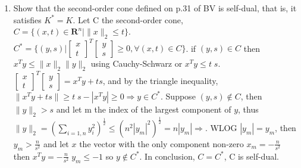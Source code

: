 \documentclass[10pt]{article}
\newcommand{\0}{\mat{0}}
\begin{document}
\begin{enumerate}
\item Show that the second-order cone defined on p.31 of BV is self-dual, that is, it satisfies $K^* = K$.
Let C the second-order cone, $C=\{(x, t) \in  \mathbf{R}^n | \| x \|_2 \le t \}$. $C^* = \{(y,s) | \begin{bmatrix} x \\ t  \end{bmatrix}^T \begin{bmatrix} y \\ s  \end{bmatrix} \ge 0, \forall (x,t) \in C\}$.
if $(y, s) \in C$ then $x^T y \le \| x \|_2 \| y \|_2$ using Cauchy-Schwarz or  $x^T y \le t \; s$. 
$\begin{bmatrix} x \\ t  \end{bmatrix}^T \begin{bmatrix} y \\ s  \end{bmatrix}  = x^T y + ts$, and by the triangle inequality, $\|x^T y + ts\|  \ge t \; s - | x^T y | \ge 0 \Rightarrow y \in C^*$.
Suppose $(y, s) \notin C$, then $\| y \|_2 > s$ and let m the index of the largest component of $y$, 
thus $\| y \|_2 = (\sum_{i=1,n} y_i^2)^{\frac{1}{2}} \le (n^2 |y_m|^2)^{\frac{1}{2}} = n |y_m| \Rightarrow $. WLOG $| y_m | = y_m$, then $y_m > \frac{n} {s^2}$
and let $x$ the vector with the only component non-zero $x_m = - \frac{n} {s^2}$ then $x^T y = - \frac{n} {s^2} \; y_m \le - 1$ so $y \notin C^*$.
In conclusion, $C = C^*$, C is self-dual.
 

 
\end{enumerate}
\end{document}
